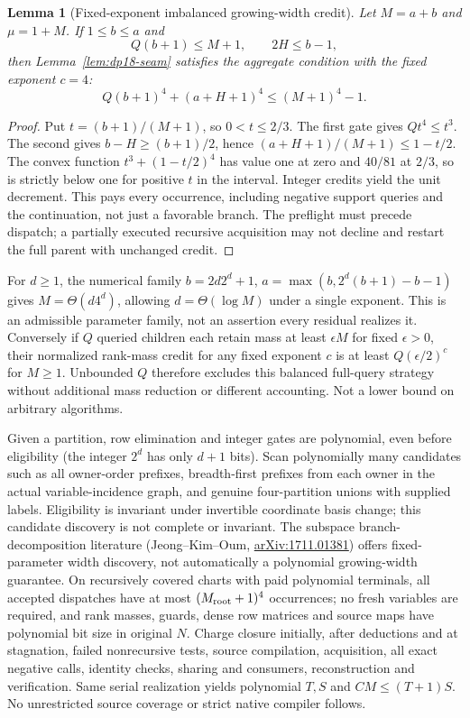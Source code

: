 \documentclass[11pt]{article}
\newtheorem{lemma}[theorem]{Lemma}
\begin{document}
\begin{lemma}[Fixed-exponent imbalanced growing-width credit]\label{lem:dp18-credit}
Let $M=a+b$ and $\mu=1+M$. If $1\le b\le a$ and
\[
 Q(b+1)\le M+1,\qquad 2H\le b-1,
\]
then Lemma~\ref{lem:dp18-seam} satisfies the aggregate condition with the fixed exponent $c=4$:
\[
 Q(b+1)^4+(a+H+1)^4\le (M+1)^4-1.
\]
\end{lemma}
\begin{proof}
Put $t=(b+1)/(M+1)$, so $0<t\le2/3$. The first gate gives $Qt^4\le t^3$. The second gives $b-H\ge(b+1)/2$, hence $(a+H+1)/(M+1)\le1-t/2$. The convex function $t^3+(1-t/2)^4$ has value one at zero and $40/81$ at $2/3$, so is strictly below one for positive $t$ in the interval. Integer credits yield the unit decrement. This pays every occurrence, including negative support queries and the continuation, not just a favorable branch. The preflight must precede dispatch; a partially executed recursive acquisition may not decline and restart the full parent with unchanged credit.
\end{proof}
For $d\ge1$, the numerical family $b=2d2^d+1$, $a=\max(b,2^d(b+1)-b-1)$ gives $M=\Theta(d4^d)$, allowing $d=\Theta(\log M)$ under a single exponent. This is an admissible parameter family, not an assertion every residual realizes it. Conversely if $Q$ queried children each retain mass at least $\epsilon M$ for fixed $\epsilon>0$, their normalized rank-mass credit for any fixed exponent $c$ is at least $Q(\epsilon/2)^c$ for $M\ge1$. Unbounded $Q$ therefore excludes this balanced full-query strategy without additional mass reduction or different accounting. Not a lower bound on arbitrary algorithms.

Given a partition, row elimination and integer gates are polynomial, even before eligibility (the integer $2^d$ has only $d+1$ bits). Scan polynomially many candidates such as all owner-order prefixes, breadth-first prefixes from each owner in the actual variable-incidence graph, and genuine four-partition unions with supplied labels. Eligibility is invariant under invertible coordinate basis change; this candidate discovery is not complete or invariant. The subspace branch-decomposition literature (Jeong--Kim--Oum, \href{https://arxiv.org/abs/1711.01381}{arXiv:1711.01381}) offers fixed-parameter width discovery, not automatically a polynomial growing-width guarantee. On recursively covered charts with paid polynomial terminals, all accepted dispatches have at most $(M_{\rm root}+1)^4$ occurrences; no fresh variables are required, and rank masses, guards, dense row matrices and source maps have polynomial bit size in original $N$. Charge closure initially, after deductions and at stagnation, failed nonrecursive tests, source compilation, acquisition, all exact negative calls, identity checks, sharing and consumers, reconstruction and verification. Same serial realization yields polynomial $T,S$ and $CM\le(T+1)S$. No unrestricted source coverage or strict native compiler follows.
\end{document}
